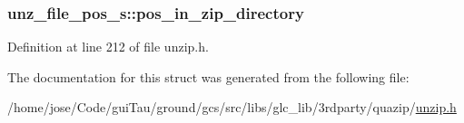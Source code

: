 \hypertarget{structunz__file__pos__s_a87d193346d3825363f899f574a2f3cb2}{
\subsubsection[{pos\-\_\-in\-\_\-zip\-\_\-directory}]{ unz\-\_\-file\-\_\-pos\-\_\-s\-::pos\-\_\-in\-\_\-zip\-\_\-directory}}\label{structunz__file__pos__s_a87d193346d3825363f899f574a2f3cb2}


Definition at line 212 of file unzip.\-h.



The documentation for this struct was generated from the following file\-:\begin{DoxyCompactItemize}
\item 
/home/jose/\-Code/gui\-Tau/ground/gcs/src/libs/glc\-\_\-lib/3rdparty/quazip/\hyperlink{unzip_8h}{unzip.\-h}\end{DoxyCompactItemize}
